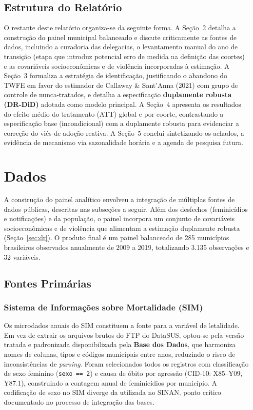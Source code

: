 \documentclass[twocolumn, 10pt]{article}
\begin{document}
\subsection{Estrutura do Relatório}

O restante deste relatório organiza-se da seguinte forma. A Seção~2 detalha a
construção do painel municipal balanceado e discute criticamente as fontes de
dados, incluindo a curadoria das delegacias, o levantamento manual do ano de
transição (etapa que introduz potencial erro de medida na definição das coortes)
e as covariáveis socioeconômicas e de violência incorporadas à estimação.
A Seção~3 formaliza a estratégia de identificação, justificando o abandono do
TWFE em favor do estimador de Callaway \& Sant'Anna (2021) com grupo de controle
de nunca-tratados, e detalha a especificação \textbf{duplamente robusta (DR-DiD)}
adotada como modelo principal. A Seção~4 apresenta os resultados do efeito médio
do tratamento (ATT) global e por coorte, contrastando a especificação base
(incondicional) com a duplamente robusta para evidenciar a correção do viés de
adoção reativa. A Seção~5 conclui sintetizando os achados, a evidência de
mecanismo via sazonalidade horária e a agenda de pesquisa futura.

\section{Dados}

A construção do painel analítico envolveu a integração de múltiplas fontes de
dados públicas, descritas nas subseções a seguir. Além dos desfechos (feminicídios
e notificações) e da população, o painel incorpora um conjunto de covariáveis
socioeconômicas e de violência que alimentam a estimação duplamente robusta
(Seção~\ref{sec:dr}). O produto final é um painel balanceado de 285 municípios
brasileiros observados anualmente de 2009 a 2019, totalizando 3.135 observações
e 32 variáveis.

\subsection{Fontes Primárias}

\subsubsection{Sistema de Informações sobre Mortalidade (SIM)}
Os microdados anuais do SIM constituem a fonte para a variável de letalidade.
Em vez de extrair os arquivos brutos do FTP do DataSUS, optou-se pela versão
tratada e padronizada disponibilizada pela \textbf{Base dos Dados}, que harmoniza
nomes de colunas, tipos e códigos municipais entre anos, reduzindo o risco de
inconsistências de \textit{parsing}. Foram selecionados todos os registros com
classificação de sexo feminino (\texttt{sexo == 2}) e causa de óbito por agressão
(CID-10: X85--Y09, Y87.1), construindo a contagem anual de feminicídios por
município. A codificação de sexo no SIM diverge da utilizada no SINAN, ponto
crítico documentado no processo de integração das bases.
\end{document}
